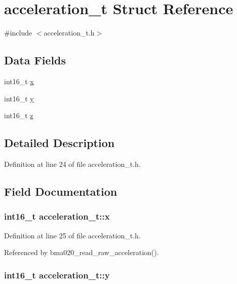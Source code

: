 \hypertarget{structacceleration__t}{\section{acceleration\-\_\-t Struct Reference}
\label{structacceleration__t}
}


{\ttfamily \#include $<$acceleration\-\_\-t.\-h$>$}

\subsection*{Data Fields}
\begin{DoxyCompactItemize}
\item 
int16\-\_\-t \hyperlink{structacceleration__t_a00bbb5e7e6ae3d7aa2c494468069ef1c}{x}
\item 
int16\-\_\-t \hyperlink{structacceleration__t_aea547b9a2c90b379e4cf5cd3ae0c7944}{y}
\item 
int16\-\_\-t \hyperlink{structacceleration__t_abd26d67856d2486cf776b4b408ccfc84}{z}
\end{DoxyCompactItemize}


\subsection{Detailed Description}


Definition at line 24 of file acceleration\-\_\-t.\-h.



\subsection{Field Documentation}
\hypertarget{structacceleration__t_a00bbb5e7e6ae3d7aa2c494468069ef1c}{
\subsubsection[{x}]{\setlength{\rightskip}{0pt plus 5cm}int16\-\_\-t acceleration\-\_\-t\-::x}}\label{structacceleration__t_a00bbb5e7e6ae3d7aa2c494468069ef1c}


Definition at line 25 of file acceleration\-\_\-t.\-h.



Referenced by bma020\-\_\-read\-\_\-raw\-\_\-acceleration().

\hypertarget{structacceleration__t_aea547b9a2c90b379e4cf5cd3ae0c7944}{
\subsubsection[{y}]{\setlength{\rightskip}{0pt plus 5cm}int16\-\_\-t acceleration\-\_\-t\-::y}}\label{structacceleration__t_aea547b9a2c90b379e4cf5cd3ae0c7944}



